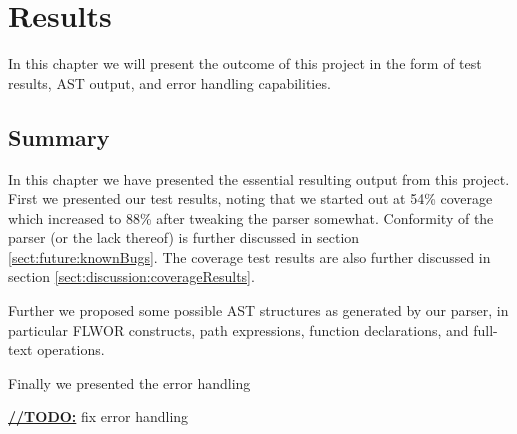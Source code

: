 \chapter{Results}
In this chapter we will present the outcome of this project in the form of test
results, AST output, and error handling capabilities.





\section{Summary}
In this chapter we have presented the essential resulting output from this
project. First we presented our test results, noting that we started out at   
54\% coverage which increased to 88\% after tweaking the parser somewhat.
Conformity of the parser (or the lack thereof) is further discussed in section
\ref{sect:future:knownBugs}. The coverage test results are also further
discussed in section \ref{sect:discussion:coverageResults}.

Further we proposed some possible AST structures as generated by our parser, in
particular FLWOR constructs, path expressions, function declarations, and
full-text operations.

Finally we presented the error handling



\underline{\textbf{\LARGE //TODO:}} fix error handling